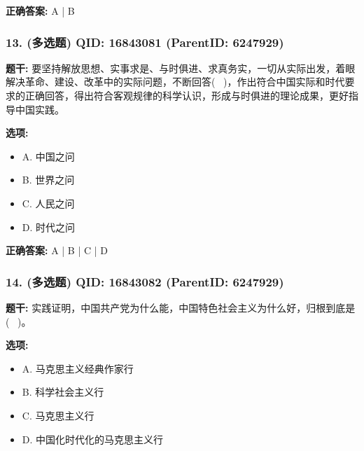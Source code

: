 \documentclass[12pt,UTF8]{ctexart}
\begin{document}
\textbf{正确答案:}
A | B

\vspace{0.3em}\hrulefill\vspace{0.7em}

\subsubsection*{13. (多选题) \small QID: 16843081 (ParentID: 6247929)}

\textbf{题干:}
要坚持解放思想、实事求是、与时俱进、求真务实，一切从实际出发，着眼解决革命、建设、改革中的实际问题，不断回答(  )，作出符合中国实际和时代要求的正确回答，得出符合客观规律的科学认识，形成与时俱进的理论成果，更好指导中国实践。



\textbf{选项:}
\begin{itemize}[leftmargin=*]

  \item A. 中国之问

  \item B. 世界之问

  \item C. 人民之问

  \item D. 时代之问

\end{itemize}

\textbf{正确答案:}
A | B | C | D

\vspace{0.3em}\hrulefill\vspace{0.7em}

\subsubsection*{14. (多选题) \small QID: 16843082 (ParentID: 6247929)}

\textbf{题干:}
实践证明，中国共产党为什么能，中国特色社会主义为什么好，归根到底是(  )。



\textbf{选项:}
\begin{itemize}[leftmargin=*]

  \item A. 马克思主义经典作家行

  \item B. 科学社会主义行

  \item C. 马克思主义行

  \item D. 中国化时代化的马克思主义行

\end{itemize}
\end{document}
